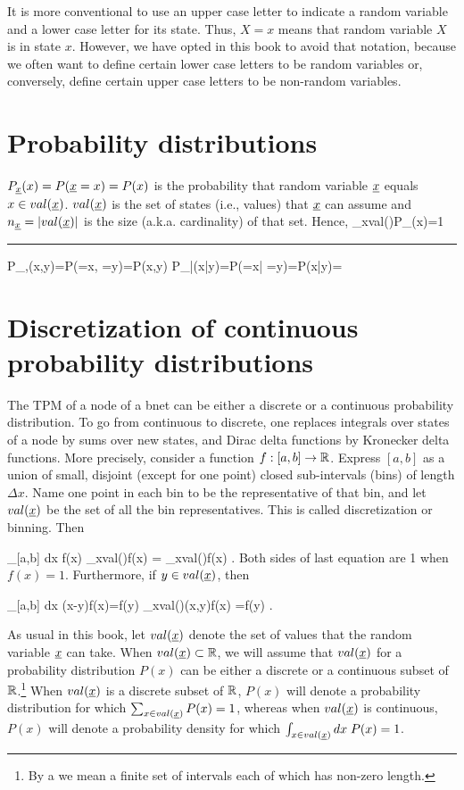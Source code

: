 It is more
conventional to
use an upper
case letter to
indicate
a random
variable
and a lower case letter
for its state.
Thus, $X=x$ means that
random variable
$X$ is in state $x$.
However,
we have
opted
in this
book to
avoid
that notation,
because
we often
want to define
certain lower
case letters
to be random variables
or, conversely, define certain upper
case letters to
be non-random variables.

\section{Probability distributions}
 $P_\rvx(x)=P(\rvx=x)=P(x)$ is the probability that random variable $\rvx$ equals $x\in val(\rvx)$. $val(\rvx)$ is the set of states (i.e., values) that $\rvx$ can assume and $n_\rvx = |val(\rvx)|$ is the size (a.k.a. cardinality) of that set. Hence,
\beq
\sum_{x\in val(\rvx)}P_\rvx(x)=1
\eeq

\hrule
\beq
P_{\rvx,\rvy}(x,y)=P(\rvx=x, \rvy=y)=P(x,y)
\eeq
\beq
P_{\rvx|\rvy}(x|y)=P(\rvx=x| \rvy=y)=P(x|y)=
\eeq



\section{Discretization
of continuous
probability distributions}

The TPM of a node
of a bnet can be either a discrete or
a continuous probability distribution.
To go from continuous to discrete, one
replaces integrals over states of a node
 by sums over new states, and Dirac delta
functions by Kronecker delta functions.
 More precisely, consider a function
$f: [a, b]\rightarrow { \mathbb{R}}$. Express
 $[a,b]$ as
a union of
small, disjoint (except for
one point) closed sub-intervals (bins) of
length $\Delta x$.
Name one point
in each bin to be the representative of that bin,
and  let $val(\rvx)$ be the
set of all the bin representatives. This is called
discretization or binning. Then

\beq
{}
\int_{[a,b]} dx \; f(x)\rarrow
{} \sum_{x\in val(\rvx)}f(x)
=
 \sum_{x\in val(\rvx)}f(x)
 \;.
\eeq
Both sides of last equation are 1 when $f(x)=1$.
 Furthermore, if $y\in val(\rvx)$, then

\beq
\int_{[a,b]} dx \; \delta(x-y)f(x)=f(y)
\rarrow \sum_{x\in val(\rvx)}\delta(x,y)f(x)
=f(y)
\;.
\eeq

As usual in this book, let $val(\rvx)$ denote the set of
values that the random variable $\rvx$ can take.
When $val(\rvx)\subset \RR$,
we will assume that $val(\rvx)$
for a probability distribution $P(x)$
can be either a discrete or a continuous
subset of ${ \mathbb{R}}$.\footnote{By a  we
mean a finite set of intervals
 each of which has non-zero length.}
When $val(\rvx)$ is a discrete subset of ${ \mathbb{R}}$, $P(x)$
will denote a probability distribution
for which $\sum_{x\in val(\rvx)}P(x)=1$, whereas when
$val(\rvx)$ is continuous, $P(x)$ will denote
a probability density
for which $\int_{x\in val(\rvx)}dx\; P(x)=1$.

